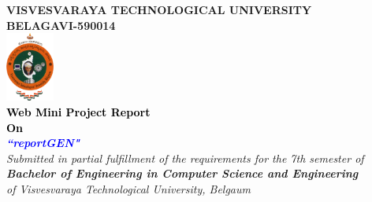 \thispagestyle{empty}
\begin{titlepage}
\begin{center}
\textup{\large{\textcolor{darkbrown}{\bf VISVESVARAYA TECHNOLOGICAL UNIVERSITY} \\ {\textcolor{darkbrown}{\bf BELAGAVI-590014}}}}\\
\includegraphics[width=0.12\textwidth]{./../static/media/VTU.png}\\
\textup{\small{\textcolor{black}{\textbf{Web Mini Project Report} \\ {\textbf{On}}}}} \\
\textup{\large{\textcolor{blue}{\textbf{\textit{``reportGEN"}}}}} \\[0.2in]

\textup{{\textit {Submitted in partial fulfillment of the requirements for the 7th semester of} \\ {\textbf {\textit {Bachelor of Engineering in Computer Science and Engineering}} \\ \textit {of Visvesvaraya Technological University, Belgaum}}}}\\


\end{center}
\end{titlepage}
